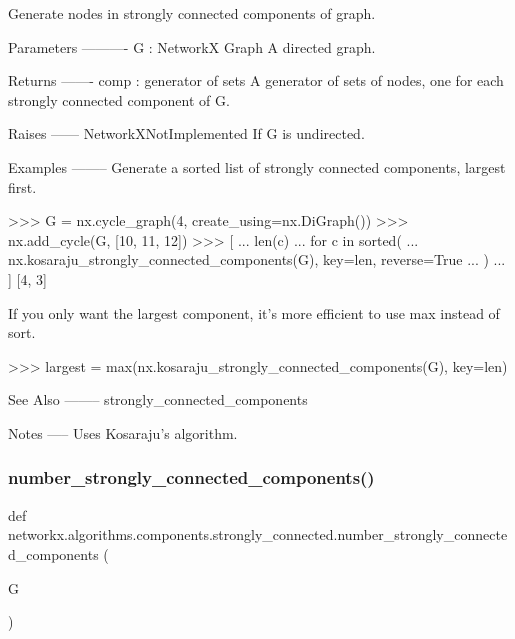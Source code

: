 \begin{DoxyVerb}Generate nodes in strongly connected components of graph.

Parameters
----------
G : NetworkX Graph
    A directed graph.

Returns
-------
comp : generator of sets
    A generator of sets of nodes, one for each strongly connected
    component of G.

Raises
------
NetworkXNotImplemented
    If G is undirected.

Examples
--------
Generate a sorted list of strongly connected components, largest first.

>>> G = nx.cycle_graph(4, create_using=nx.DiGraph())
>>> nx.add_cycle(G, [10, 11, 12])
>>> [
...     len(c)
...     for c in sorted(
...         nx.kosaraju_strongly_connected_components(G), key=len, reverse=True
...     )
... ]
[4, 3]

If you only want the largest component, it's more efficient to
use max instead of sort.

>>> largest = max(nx.kosaraju_strongly_connected_components(G), key=len)

See Also
--------
strongly_connected_components

Notes
-----
Uses Kosaraju's algorithm.\end{DoxyVerb}
 \mbox{\label{namespacenetworkx_1_1algorithms_1_1components_1_1strongly__connected_a745e4742626183849db17f435477ad4b}} 
\subsubsection{\texorpdfstring{number\+\_\+strongly\+\_\+connected\+\_\+components()}{number\_strongly\_connected\_components()}}
{\footnotesize\ttfamily def networkx.\+algorithms.\+components.\+strongly\+\_\+connected.\+number\+\_\+strongly\+\_\+connected\+\_\+components (\begin{DoxyParamCaption}\item[{}]{G }\end{DoxyParamCaption})}

